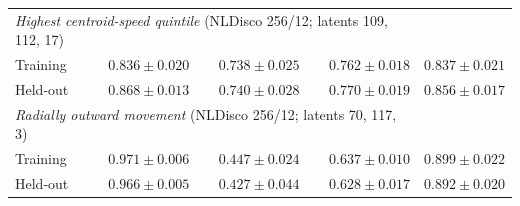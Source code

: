 \begin{tabular*}{\linewidth}{@{\extracolsep{\fill}}lrrrr@{}}
\midrule
\multicolumn{4}{l}{\textit{Highest centroid-speed quintile} (NLDisco 256/12; latents 109, 112, 17)} \\
Training & $0.836{\pm}0.020$ & $0.738{\pm}0.025$ & $0.762{\pm}0.018$ & $0.837{\pm}0.021$ \\
Held-out & $0.868{\pm}0.013$ & $0.740{\pm}0.028$ & $0.770{\pm}0.019$ & $0.856{\pm}0.017$ \\
\midrule
\multicolumn{4}{l}{\textit{Radially outward movement} (NLDisco 256/12; latents 70, 117, 3)} \\
Training & $0.971{\pm}0.006$ & $0.447{\pm}0.024$ & $0.637{\pm}0.010$ & $0.899{\pm}0.022$ \\
Held-out & $0.966{\pm}0.005$ & $0.427{\pm}0.044$ & $0.628{\pm}0.017$ & $0.892{\pm}0.020$ \\
\bottomrule
\end{tabular*}
